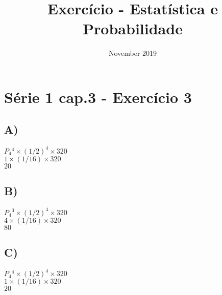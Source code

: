 \documentclass{article}
\title{Exercício - Estatística e Probabilidade}
\date{November 2019}
\begin{document}
\section*{Série 1 cap.3 - Exercício 3}
    
    \subsection*{A)}
    $P{_4}^4 \times (1/2)^4 \times 320$ \\
    $ 1 \times (1/16) \times 320$ \\
    $20$ \\
    
    \subsection*{B)}
    $P{_4}^3 \times (1/2)^4 \times 320$ \\
    $ 4 \times (1/16) \times 320$ \\
    $80$ \\
    
    \subsection*{C)}
    $P{_4}^4 \times (1/2)^4 \times 320$ \\
    $ 1 \times (1/16) \times 320$ \\
    $20$ \\
    
\end{document}
